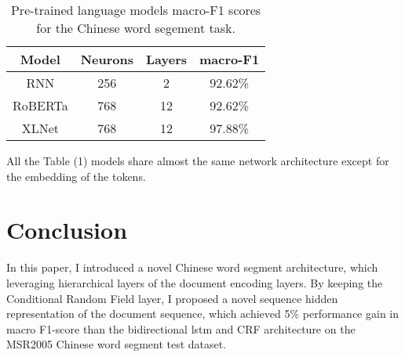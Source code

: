 \documentclass[11pt,a4paper]{article}
\begin{document}
\begin{table}
\centering
\begin{tabular}{cccc}
\hline
\textbf{Model} & \textbf{Neurons}& \textbf{Layers} & \textbf{macro-F1} \\
\hline
RNN & 256 & 2 & 92.62\% \\
RoBERTa & 768 & 12 & 92.62\% \\
XLNet & 768 & 12 & 97.88\% \\
\hline
\end{tabular}
\caption{Pre-trained language models macro-F1 scores for the Chinese word segement task.}
\end{table}


All the Table (1) models share almost the same network architecture except for the embedding of the tokens.


\section{Conclusion}

In this paper, I introduced a novel Chinese word segment architecture, which leveraging hierarchical layers of the document encoding layers.
By keeping the Conditional Random Field layer, I proposed a novel sequence hidden representation of the document sequence, which achieved 5\% performance gain in macro F1-score than
the bidirectional lstm and CRF architecture on the MSR2005 Chinese word segment test dataset.





\end{document}
